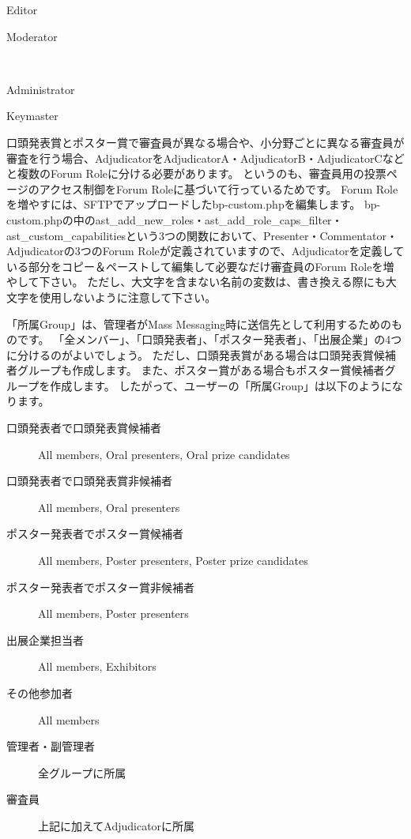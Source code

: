 \documentclass[titlepage,10pt,a4paper,uplatex]{jsbook}
\begin{document}
\begin{description}
\begin{description}
\vspace{-17pt}
\item[Site Role] Editor
\item[Forum Role] Moderator
\end{description}
\item[管理者]\mbox{}\\
\begin{description}
\vspace{-17pt}
\item[Site Role] Administrator
\item[Forum Role] Keymaster
\end{description}
\end{description}

口頭発表賞とポスター賞で審査員が異なる場合や、小分野ごとに異なる審査員が審査を行う場合、AdjudicatorをAdjudicatorA・AdjudicatorB・AdjudicatorCなどと複数のForum Roleに分ける必要があります。
というのも、審査員用の投票ページのアクセス制御をForum Roleに基づいて行っているためです。
Forum Roleを増やすには、SFTPでアップロードしたbp-custom.phpを編集します。
bp-custom.phpの中のast\_add\_new\_roles・ast\_add\_role\_caps\_filter・ast\_custom\_capabilitiesという3つの関数において、Presenter・Commentator・Adjudicatorの3つのForum Roleが定義されていますので、Adjudicatorを定義している部分をコピー＆ペーストして編集して必要なだけ審査員のForum Roleを増やして下さい。
ただし、大文字を含まない名前の変数は、書き換える際にも大文字を使用しないように注意して下さい。

「所属Group」は、管理者がMass Messaging時に送信先として利用するためのものです。
「全メンバー」、「口頭発表者」、「ポスター発表者」、「出展企業」の4つに分けるのがよいでしょう。
ただし、口頭発表賞がある場合は口頭発表賞候補者グループも作成します。
また、ポスター賞がある場合もポスター賞候補者グループを作成します。
したがって、ユーザーの「所属Group」は以下のようになります。

\begin{description}
\item[口頭発表者で口頭発表賞候補者] All members, Oral presenters, Oral prize candidates
\item[口頭発表者で口頭発表賞非候補者] All members, Oral presenters
\item[ポスター発表者でポスター賞候補者] All members, Poster presenters, Poster prize candidates
\item[ポスター発表者でポスター賞非候補者] All members, Poster presenters
\item[出展企業担当者] All members, Exhibitors
\item[その他参加者] All members
\item[管理者・副管理者] 全グループに所属
\item[審査員] 上記に加えてAdjudicatorに所属
\end{description}
\end{document}
